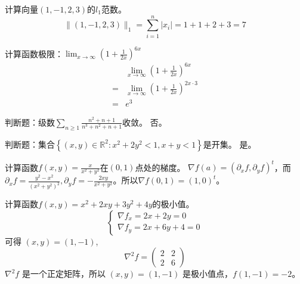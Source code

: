 

\newcommand\Title{2021智能计算数学基础试卷}
\renewcommand\due{due: November 6, 2022}
\newcommand\minimize{\operatorname{minimize}} %
\newcommand\maximize{\operatorname{maximize}} %
\newcommand\subject{\operatorname{subject\ to}}

\newcommand{\todo}{{\color{red} to do}} %




\begin{problem}
	计算向量$(1,-1,2,3)$的$l_1$范数。
	\solution $$\|(1,-1,2,3)\|_1=\sum_{i=1}^n|x_i|=1+1+2+3=7$$
\end{problem}

\begin{problem}
	计算函数极限：$\lim_{x\to \infty}(1+\frac{1}{2x})^{6x}$
	\solution \begin{align*}
		&\lim_{x\to \infty}(1+\frac{1}{2x})^{6x}\\
		=&\lim_{x\to \infty}(1+\frac{1}{2x})^{2x\cdot 3}\\
		=&e^3
	\end{align*}
\end{problem}


\begin{problem}
	判断题：级数$\sum_{n\ge 1}\frac{n^2+n+1}{n^3+n^2+n+1}$收敛。
	\solution 否。
\end{problem}

\begin{problem}
	判断题：集合$\left\{(x,y)\in\mathbb{R}^{2}:x^2+2y^2<1,x+y<1\right\}$是开集。
	\solution 是。
\end{problem}

\begin{problem}
	计算函数$f(x,y)=\frac{x}{x^2+y^2}$在$(0,1)$点处的梯度。
	\solution$\nabla f(a)=(\partial_xf,\partial_yf)^t$，而$\partial_xf=\frac{y^2-x^2}{(x^2+y^2)^2},\partial_yf=-\frac{2xy}{x^2+y^2}$。所以$\nabla f(0, 1)=\left(1, 0\right)^t$。
\end{problem}


\begin{problem}
	计算函数$f(x,y)=x^2+2xy+3y^2+4y$的极小值。
	\solution \[\begin{cases}
		\nabla f_x = 2x + 2y = 0\\
		\nabla f_y = 2x + 6y + 4 = 0
	\end{cases}\]
	可得 $(x, y) = (1, -1)$,
	\[\nabla^2f = \begin{pmatrix}
		2 & 2\\
		2 & 6
	\end{pmatrix}\] 
	$\nabla^2f$ 是一个正定矩阵，所以 $(x, y) = (1, -1)$ 是极小值点，$f(1, -1) = -2$。
\end{problem}

